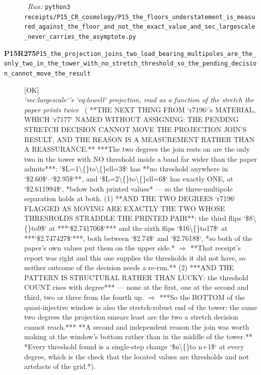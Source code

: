 \begin{description}
\ \emph{Run:} \texttt{python3 receipts/P15\_CR\_cosmology/P15\_the\_floors\_understatement\_is\_measured\_against\_the\_floor\_and\_not\_the\_exact\_value\_and\_sec\_largescale\_never\_carries\_the\_asymptote.py}
\item[\rcptlabel{P15_the_projection_joins_two_load_bearing_multipoles_are_the_only_two_in_the_tower_with_no_stretch_threshold_so_the_pending_decision_cannot_move_the_result}{P15R275}\textbf{P15R275}\quad\texttt{P15\_the\_projection\_joins\_two\_load\_bearing\_multipoles\_are\_the\_only\_two\_in\_the\_tower\_with\_no\_stretch\_threshold\_so\_the\_pending\_decision\_cannot\_move\_the\_result}]\hfill\textsf{[OK]}\\
\textit{`sec:largescale`'s `eq:lowell` projection, read as a function of the stretch the paper prints twice} \ ( **THE NEXT THING FROM `r7196`'s MATERIAL, WHICH `r7177` NAMED WITHOUT ASSIGNING: THE PENDING STRETCH DECISION CANNOT MOVE THE PROJECTION JOIN'S RESULT, AND THE REASON IS A MEASUREMENT RATHER THAN A REASSURANCE.** ***The two degrees the join rests on are the only two in the tower with NO threshold inside a band far wider than the paper admits***: `\$L=1\textbackslash\{\}to\textbackslash\{\}ell=3\$` has **no threshold anywhere in `\$2.60\$`--`\$2.95\$`**, and `\$L=2\textbackslash\{\}to\textbackslash\{\}ell=6\$` has exactly ONE, at `\$2.611994\$`, *below both printed values* --- so the three-multipole separation holds at both.  (1) **AND THE TWO DEGREES `r7196` FLAGGED AS MOVING ARE EXACTLY THE TWO WHOSE THRESHOLDS STRADDLE THE PRINTED PAIR**: the third flips `\$8\textbackslash\{\}to9\$` at ***`\$2.741706\$`*** and the sixth flips `\$16\textbackslash\{\}to17\$` at ***`\$2.747427\$`***, both between `\$2.74\$` and `\$2.7618\$`, *so both of the paper's own values put them on the upper side.* \ensuremath{\Rightarrow} **That receipt's report was right and this one supplies the thresholds it did not have, so neither outcome of the decision needs a re-run.**  (2) ***AND THE PATTERN IS STRUCTURAL RATHER THAN LUCKY: the threshold COUNT rises with degree*** --- none at the first, one at the second and third, two or three from the fourth up. \ensuremath{\Rightarrow} ***So the BOTTOM of the quasi-injective window is also the stretch-robust end of the tower: the same two degrees the projection smears least are the two a stretch decision cannot reach.*** **A second and independent reason the join was worth making at the window's bottom rather than in the middle of the tower.**  *Every threshold found is a single-step change `\$n\textbackslash\{\}to n+1\$` at every degree, which is the check that the located values are thresholds and not artefacts of the grid.*). 

\end{description}
